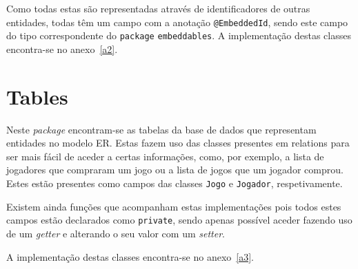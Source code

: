 Como todas estas são representadas através de identificadores de outras entidades, todas têm um campo com a anotação \texttt{@EmbeddedId}, sendo este campo do tipo
correspondente do \texttt{package} \texttt{embeddables}. A implementação destas classes encontra-se no anexo~\ref{a2}.

\section{Tables} \label{sec23}

Neste \textit{package} encontram-se as tabelas da base de dados que representam entidades no modelo ER. Estas fazem uso das classes presentes em relations para ser mais
fácil de aceder a certas informações, como, por exemplo, a lista de jogadores que compraram um jogo ou a lista de jogos que um jogador comprou. Estes estão presentes como
campos das classes \texttt{Jogo} e \texttt{Jogador}, respetivamente.

Existem ainda funções que acompanham estas implementações pois todos estes campos estão declarados como \texttt{private}, sendo apenas possível aceder fazendo uso de um
\textit{getter} e alterando o seu valor com um \textit{setter}.

A implementação destas classes encontra-se no anexo~\ref{a3}.